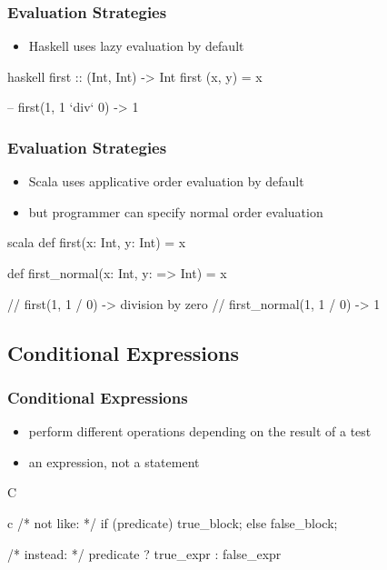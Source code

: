 \documentclass[dvipsnames]{beamer}
\theoremstyle{plain}
\begin{document}
\begin{frame}[fragile]
  \frametitle{Evaluation Strategies}

  \begin{itemize}
    \item Haskell uses lazy evaluation by default
  \end{itemize}

  \begin{example}[Haskell]
    \begin{pygments}{haskell}
first :: (Int, Int) -> Int
first (x, y) = x

-- first(1, 1 `div` 0) -> 1
    \end{pygments}
  \end{example}
\end{frame}

\begin{frame}[fragile]
  \frametitle{Evaluation Strategies}

  \begin{itemize}
    \item Scala uses applicative order evaluation by default
    \item but programmer can specify normal order evaluation
  \end{itemize}

  \begin{example}[Scala]
    \begin{pygments}{scala}
def first(x: Int, y: Int) = x

def first_normal(x: Int, y: => Int) = x

// first(1, 1 / 0) -> division by zero
// first_normal(1, 1 / 0) -> 1
    \end{pygments}
  \end{example}
\end{frame}

\subsection{Conditional Expressions}

\begin{frame}[fragile]
  \frametitle{Conditional Expressions}

  \begin{itemize}
    \item perform different operations depending on the result of a test
    \item an expression, not a statement
  \end{itemize}

  \pause
  \begin{block}{C}
    \begin{pygments}{c}
/* not like: */
if (predicate)
    true_block;
else
    false_block;

/* instead: */
predicate ? true_expr : false_expr
    \end{pygments}
  \end{block}
\end{frame}
\end{document}
